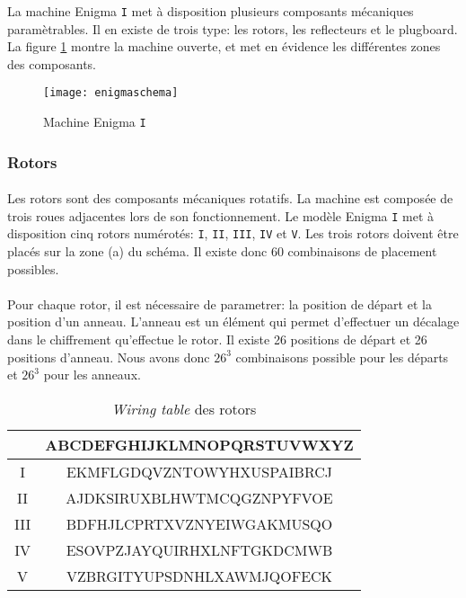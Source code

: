 \documentclass[letterpaper]{article}
\begin{document}
La machine Enigma \texttt{I} met à disposition plusieurs composants mécaniques paramètrables. Il en existe de trois type:  les rotors, les reflecteurs et le plugboard. La figure \ref{fig:enigmaschema} montre la machine ouverte, et met en évidence les différentes zones des composants.

\begin{figure}
    \centering
    \texttt{[image: enigmaschema]}
    \caption{Machine Enigma \texttt{I}}
    \label{fig:enigmaschema}
\end{figure}

\subsubsection{Rotors}

\paragraph{}

Les rotors sont des composants mécaniques rotatifs. La machine est composée de trois roues adjacentes lors de son fonctionnement. Le modèle Enigma \texttt{I} met à disposition cinq rotors numérotés: \texttt{I}, \texttt{II}, \texttt{III}, \texttt{IV} et \texttt{V}. Les trois rotors doivent être placés sur la zone (a) du schéma. Il existe donc 60 combinaisons de placement possibles.

\paragraph{}

Pour chaque rotor, il est nécessaire de parametrer: la position de départ et la position d'un anneau. L'anneau est un élément qui permet d'effectuer un décalage dans le chiffrement qu'effectue le rotor. Il existe 26 positions de départ et 26 positions d'anneau. Nous avons donc $26^3$ combinaisons possible pour les départs et $26^3$ pour les anneaux.
\def\arraystretch{1.8}
\begin{table}
    \centering
    \begin{tabular}{|c|c|}
        \hline
         & ABCDEFGHIJKLMNOPQRSTUVWXYZ
        \\ \hline
         I & EKMFLGDQVZNTOWYHXUSPAIBRCJ 
        \\ \hline 
         II & AJDKSIRUXBLHWTMCQGZNPYFVOE
        \\ \hline
         III & BDFHJLCPRTXVZNYEIWGAKMUSQO
        \\ \hline
         IV & ESOVPZJAYQUIRHXLNFTGKDCMWB
        \\ \hline
         V & VZBRGITYUPSDNHLXAWMJQOFECK 	
        \\ \hline
    \end{tabular}
    \caption{\textit{Wiring table} des rotors}
    \label{tab:rotors}
\end{table}
\end{document}
